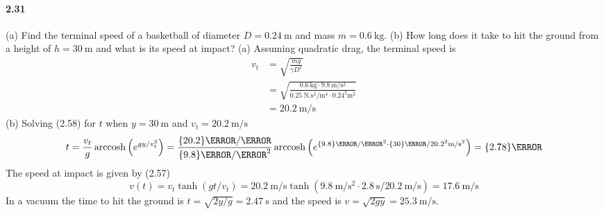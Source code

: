 \documentclass[../problems.tex]{subfiles}
\begin{document}
\paragraph{2.31} (a) Find the terminal speed of a basketball of diameter $D=\qty{0.24}{\m}$ and mass
$m=\qty{0.6}{\kg}$. \newline (b) How long does it take to hit the ground from a height of
$h=\qty{30}{\m}$ and what is its speed at impact?
\barh 
(a) Assuming quadratic drag, the terminal speed is
\begin{align*}
    v_t &= \sqrt{\frac{mg}{\gamma D^2}} \\
    &= \sqrt{\frac{\qty{0.6}{\kg} \cdot \qty{9.8}{\m/\s^2}}{\qty{0.25}{\N.\s^2\per\m^4} \cdot 
        0.24^2\si{\m}^2}} \\
    &= \qty{20.2}{\m/\s}
\end{align*}
(b) Solving (2.58) for $t$ when $y = \qty{30}{\m}$ and $v_t = \qty{20.2}{\m/\s}$
\begin{equation*}
    t = \frac{v_t}{g} \arccosh\quantity(e^{gy/v_t^2}) 
        = \frac{\qty{20.2}{\m/\s}}{\qty{9.8}{\m/\s^2}} \arccosh\quantity(e^{\qty{9.8}{\m/\s^2} 
        \cdot \qty{30}{\m} / 20.2^2\si{\m/\s}^2})  = \qty{2.78}{\s}
\end{equation*}
The speed at impact is given by (2.57)
\begin{equation*}
    v(t) = v_t \tanh(gt/v_t) = \qty{20.2}{\m/\s} \tanh(\qty{9.8}{\m/\s^2} \cdot \qty{2.8}{\s} 
        / \qty{20.2}{\m/\s}) = \qty{17.6}{\m/\s}
\end{equation*}
In a vacuum the time to hit the ground is $t = \sqrt{2y/g} = \qty{2.47}{\s}$ and the speed is
$v = \sqrt{2gy} = \qty{25.3}{\m/\s}$.
\end{document}
